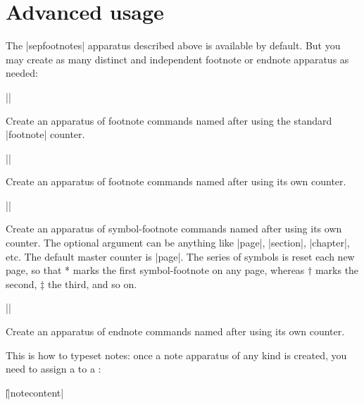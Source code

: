 \documentclass{ltxdoc}
\newenvironment{Description}
 {\par\medskip\noindent\ignorespaces}{}
\newenvironment{synopsis}
 {\begin{list}{}
  {\setlength\parsep{0pt}
   \setlength\itemsep{0pt}}}
 {\end{list}}
\begin{document}

                           \section{Advanced usage}

\begin{Description}
\DescribeMacro{\newfootnotes}
\DescribeMacro{\newfootnotes*}
\DescribeMacro{\newsymbolfootnotes}
\DescribeMacro{\newendnotes}
The |sepfootnotes| apparatus described above is available by default.
But you may create as many distinct and independent footnote or endnote apparatus as needed:
\begin{synopsis}
\item |\newfootnotes  |

Create an apparatus of footnote commands named after  using the standard |footnote| counter.\bigskip

\item |\newfootnotes* |

Create an apparatus of footnote commands named after  using its own counter.\bigskip

\item |\newsymbolfootnotes|  

Create an apparatus of symbol-footnote commands named after  using its own counter. The optional argument  can be anything like |page|, |section|, |chapter|, etc.  The default master counter is |page|. The series of symbols is reset each new page, so that * marks the first symbol-footnote on any page, whereas $\dag$ marks the second, $\ddag$ the third, and so on.\bigskip

\item |\newendnotes |

Create an apparatus of endnote commands named after  using its own counter.
\end{synopsis}
\end{Description}

\begin{Description}
This is how to typeset notes: once a note apparatus of any kind is created, you need to assign a  to a :
\begin{synopsis}
\item |\||notecontent|  
\end{synopsis}
\end{Description}
\end{document}
